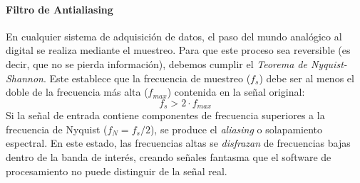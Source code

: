 \paragraph{Filtro de Antialiasing}
En cualquier sistema de adquisición de datos, el paso del mundo analógico al digital se realiza mediante el muestreo. Para que este proceso sea reversible (es decir, que no se pierda información), debemos cumplir el \emph{Teorema de Nyquist-Shannon}. Este establece que la frecuencia de muestreo ($f_s$) debe ser al menos el doble de la frecuencia más alta ($f_{max}$) contenida en la señal original:
\begin{equation}
    f_s > 2 \cdot f_{max}
\end{equation}
Si la señal de entrada contiene componentes de frecuencia superiores a la frecuencia de Nyquist ($f_N = f_s/2$), se produce el \emph{aliasing} o solapamiento espectral. En este estado, las frecuencias altas se \emph{disfrazan} de frecuencias bajas dentro de la banda de interés, creando señales fantasma que el software de procesamiento no puede distinguir de la señal real.



            
            
